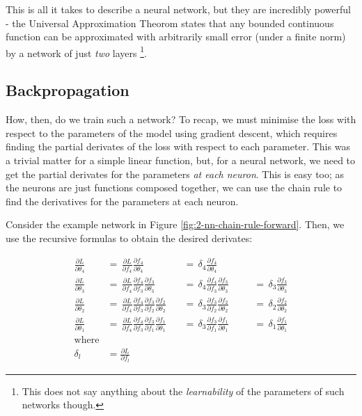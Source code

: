This is all it takes to describe a neural network, but they are incredibly powerful -
the Universal Approximation Theorom \cite{Cybenkot1989, Hornik1989}\cite[p.~105]{Mitchell1997-ML} states that any bounded continuous function can be approximated with arbitrarily small error (under a finite norm) by a network of just \textit{two} layers
\footnote{This does not say anything about the \textit{learnability} of the parameters of such networks though.}.

\subsection{Backpropagation}
How, then, do we train such a network?
To recap, we must minimise the loss with respect to the parameters of the model using gradient descent, which requires finding the partial derivates of the loss with respect to each parameter.
This was a trivial matter for a simple linear function, but, for a neural network, we need to get the partial derivates for the parameters \textit{at each neuron}.
This is easy too; as the neurons are just functions composed together, we can use the chain rule to find the derivatives for the parameters at each neuron.

Consider the example network in Figure \ref{fig:2-nn-chain-rule-forward}.
Then, we use the recursive formulas to obtain the desired derivates:

\begin{align*}
    \frac{\partial L}{\partial \theta_4} \,&=\, \frac{\partial L}{\partial f_4}\frac{\partial f_4}{\partial \theta_4} \,&&=\, \delta_4\frac{\partial f_4}{\partial \theta_4} \\[0.5em]
    \frac{\partial L}{\partial \theta_3} \,&=\, \frac{\partial L}{\partial f_4}\frac{\partial f_4}{\partial f_3}\frac{\partial f_3}{\partial \theta_3} \,&&=\, \delta_4\frac{\partial f_4}{\partial f_3}\frac{\partial f_3}{\partial \theta_3} \,&&&=\, \delta_3\frac{\partial f_3}{\partial \theta_3} \\[0.5em]
    \frac{\partial L}{\partial \theta_2} \,&=\, \frac{\partial L}{\partial f_4}\frac{\partial f_4}{\partial f_3}\frac{\partial f_3}{\partial f_2}\frac{\partial f_2}{\partial \theta_2} \,&&=\, \delta_3\frac{\partial f_3}{\partial f_2}\frac{\partial f_2}{\partial \theta_2} \,&&&=\, \delta_2\frac{\partial f_2}{\partial \theta_2} \\[0.5em]
    \frac{\partial L}{\partial \theta_1} \,&=\, \frac{\partial L}{\partial f_4}\frac{\partial f_4}{\partial f_3}\frac{\partial f_3}{\partial f_1}\frac{\partial f_1}{\partial \theta_1} \,&&=\, \delta_3\frac{\partial f_3}{\partial f_1}\frac{\partial f_1}{\partial \theta_1} \,&&&=\, \delta_1\frac{\partial f_1}{\partial \theta_1} \\[0.5em]
    \text{where}\\[0.6em]
    \delta_l &= \frac{\partial L}{\partial f_l}
\end{align*}

